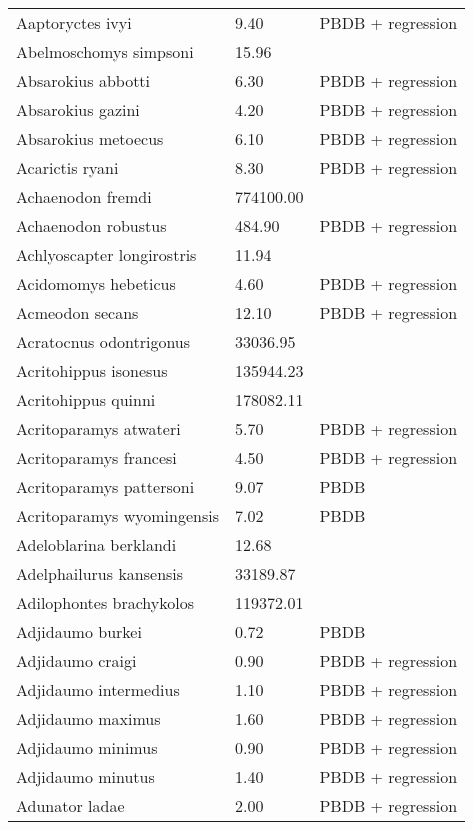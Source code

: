 \begin{longtable}{p{} p{} p{}}
    Aaptoryctes ivyi & 9.40 & PBDB + regression \\ 
    Abelmoschomys simpsoni & 15.96 & \cite{Tomiya2013} \\ 
    Absarokius abbotti & 6.30 & PBDB + regression \\ 
    Absarokius gazini & 4.20 & PBDB + regression \\ 
    Absarokius metoecus & 6.10 & PBDB + regression \\ 
    Acarictis ryani & 8.30 & PBDB + regression \\ 
    Achaenodon fremdi & 774100.00 & \cite{McKenna2011} \\ 
    Achaenodon robustus & 484.90 & PBDB + regression \\ 
    Achlyoscapter longirostris & 11.94 & \cite{Tomiya2013} \\ 
    Acidomomys hebeticus & 4.60 & PBDB + regression \\ 
    Acmeodon secans & 12.10 & PBDB + regression \\ 
    Acratocnus odontrigonus & 33036.95 & \cite{Brook2004a} \\ 
    Acritohippus isonesus & 135944.23 & \cite{Tomiya2013} \\ 
    Acritohippus quinni & 178082.11 & \cite{Tomiya2013} \\ 
    Acritoparamys atwateri & 5.70 & PBDB + regression \\ 
    Acritoparamys francesi & 4.50 & PBDB + regression \\ 
    Acritoparamys pattersoni & 9.07 & PBDB \\ 
    Acritoparamys wyomingensis & 7.02 & PBDB \\ 
    Adeloblarina berklandi & 12.68 & \cite{Tomiya2013} \\ 
    Adelphailurus kansensis & 33189.87 & \cite{Tomiya2013} \\ 
    Adilophontes brachykolos & 119372.01 & \cite{Tomiya2013} \\ 
    Adjidaumo burkei & 0.72 & PBDB \\ 
    Adjidaumo craigi & 0.90 & PBDB + regression \\ 
    Adjidaumo intermedius & 1.10 & PBDB + regression \\ 
    Adjidaumo maximus & 1.60 & PBDB + regression \\ 
    Adjidaumo minimus & 0.90 & PBDB + regression \\ 
    Adjidaumo minutus & 1.40 & PBDB + regression \\ 
    Adunator ladae & 2.00 & PBDB + regression \\ 

\end{longtable}
